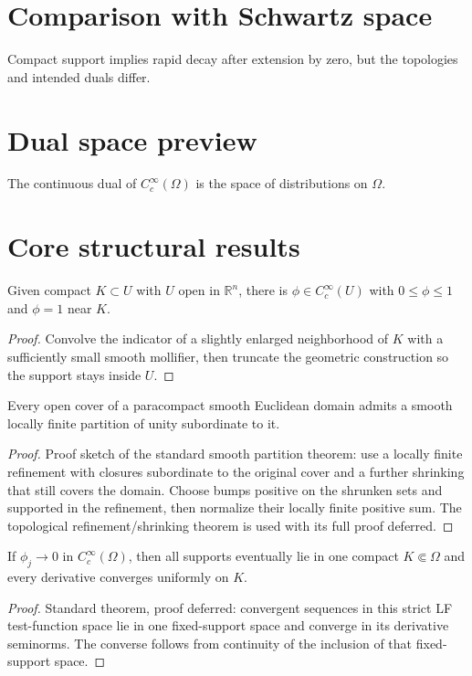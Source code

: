 \section{Comparison with Schwartz space}
Compact support implies rapid decay after extension by zero, but the topologies and intended duals differ.

\section{Dual space preview}
The continuous dual of $C_c^\infty(\Omega)$ is the space of distributions on $\Omega$.

\section{Core structural results}

\begin{theorem}\label{thm:iii15-01}
Given compact $K\subset U$ with $U$ open in $\mathbb R^n$, there is $\phi\in C_c^\infty(U)$ with $0\le\phi\le1$ and $\phi=1$ near $K$.
\begin{proof}
Convolve the indicator of a slightly enlarged neighborhood of $K$ with a sufficiently small smooth mollifier, then truncate the geometric construction so the support stays inside $U$.
\end{proof}
\end{theorem}

\begin{theorem}\label{thm:iii15-02}
Every open cover of a paracompact smooth Euclidean domain admits a smooth locally finite partition of unity subordinate to it.
\begin{proof}
Proof sketch of the standard smooth partition theorem: use a locally finite refinement with closures subordinate to the original cover and a further shrinking that still covers the domain. Choose bumps positive on the shrunken sets and supported in the refinement, then normalize their locally finite positive sum. The topological refinement/shrinking theorem is used with its full proof deferred.
\end{proof}
\end{theorem}

\begin{theorem}\label{thm:iii15-03}
If $\phi_j\to0$ in $C_c^\infty(\Omega)$, then all supports eventually lie in one compact $K\Subset\Omega$ and every derivative converges uniformly on $K$.
\begin{proof}
Standard theorem, proof deferred: convergent sequences in this strict LF test-function space lie in one fixed-support space and converge in its derivative seminorms. The converse follows from continuity of the inclusion of that fixed-support space.
\end{proof}
\end{theorem}

